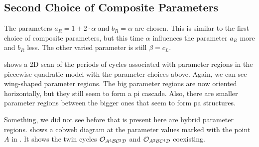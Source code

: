 \clearpage
\subsection{Second Choice of Composite Parameters}

The parameters $a_R = 1 + 2 \cdot \alpha$ and $b_R = \alpha$ are chosen.
This is similar to the first choice of composite parameters, but this time $\alpha$ influences the parameter $a_R$ more and $b_R$ less.
The other varied parameter is still $\beta = c_L$.

 shows a 2D scan of the periods of cycles associated with parameter regions in the piecewise-quadratic model with the parameter choices above.
Again, we can see wing-shaped parameter regions.
The big parameter regions are now oriented horizontally, but they still seem to form a \gls{pi} cascade.
Also, there are smaller parameter regions between the bigger ones that seem to form \gls{pa} structures.

Something, we did not see before that is present here are hybrid parameter regions.
 shows a cobweb diagram at the parameter values marked with the point $A$ in .
It shows the twin cycles $\mathcal{O}_{A^4\mathcal{B}\mathcal{C}^2\mathcal{D}}$ and $\mathcal{O}_{A^2\mathcal{B}\mathcal{C}^4\mathcal{D}}$ coexisting.

